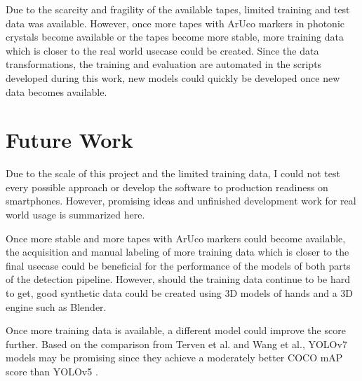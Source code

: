 \documentclass[10pt]{book}
\begin{document}
Due to the scarcity and fragility of the available tapes, limited training and test data was available. However, once more tapes with \ac{ArUco} markers in photonic crystals become available or the tapes become more stable, more training data which is closer to the real world usecase could be created. Since the data transformations, the training and evaluation are automated in the scripts developed during this work, new models could quickly be developed once new data becomes available.

\section{Future Work}

Due to the scale of this project and the limited training data, I could not test every possible approach or develop the software to production readiness on smartphones. However, promising ideas and unfinished development work for real world usage is summarized here.


Once more stable and more tapes with \ac{ArUco} markers could become available, the acquisition and manual labeling of more training data which is closer to the final usecase could be beneficial for the performance of the models of both parts of the detection pipeline. %
However, should the training data continue to be hard to get, good synthetic data could be created using 3D models of hands and a 3D engine such as Blender.


Once more training data is available, a different model could improve the score further. Based on the comparison from Terven et al. and Wang et al., \ac{YOLO}v7 models may be promising since they achieve a moderately better \ac{COCO} \ac{mAP} score than \ac{YOLO}v5 \cite{terven2023comprehensive, wang2023yolov7}.
\end{document}
